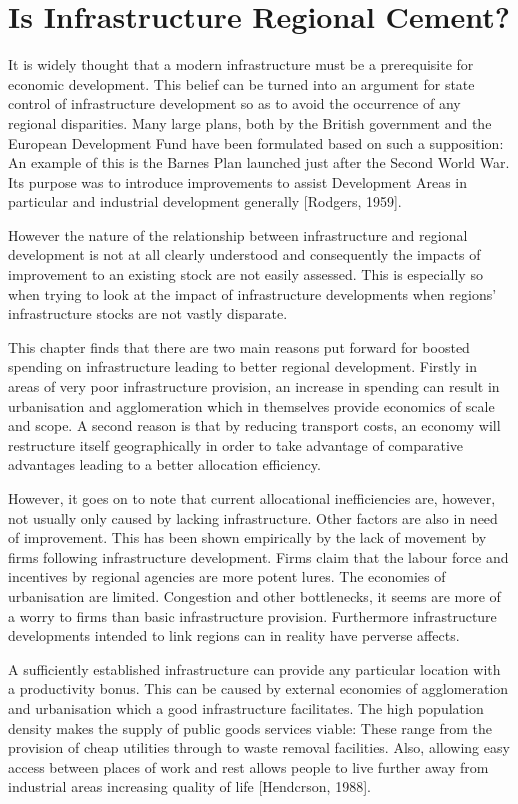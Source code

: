 \chapter{Is Infrastructure Regional Cement?}

It is widely thought that a modern infrastructure must be a prerequisite for economic development. This belief can be turned into an argument for state control of infrastructure development so as to avoid the occurrence of any regional disparities. Many large plans, both by the British government and the European Development Fund have been formulated based on such a supposition: An example of this is the Barnes Plan launched just after the Second World War. Its purpose was to introduce improvements to assist Development Areas in particular and industrial development generally [Rodgers, 1959].

However the nature of the relationship between infrastructure and regional development is not at all clearly understood and consequently the impacts of improvement to an existing stock are not easily assessed. This is especially so when trying to look at the impact of infrastructure developments when regions' infrastructure stocks are not vastly disparate.

This chapter finds that there are two main reasons put forward for boosted spending on infrastructure leading to better regional development. Firstly in areas of very poor infrastructure provision, an increase in spending can result in urbanisation and agglomeration which in themselves provide economics of scale and scope. A second reason is that by reducing transport costs, an economy will restructure itself geographically in order to take advantage of comparative advantages leading to a better allocation efficiency.

However, it goes on to note that current allocational inefficiencies are, however, not usually only caused by lacking infrastructure. Other factors are also in need of improvement. This has been shown empirically by the lack of movement by firms following infrastructure development. Firms claim that the labour force and incentives by regional agencies are more potent lures. The economies of urbanisation are limited. Congestion and other bottlenecks, it seems are more of a worry to firms than basic infrastructure provision. Furthermore infrastructure developments intended to link regions can in reality have perverse affects.
 
A sufficiently established infrastructure can provide any particular location with a productivity bonus. This can be caused by external economies of agglomeration and urbanisation which a good infrastructure facilitates. The high population density makes the supply of public goods services viable: These range from the provision of cheap utilities through to waste removal facilities. Also, allowing easy access between places of work and rest allows people to live further away from industrial areas increasing quality of life [Hendcrson, 1988].

